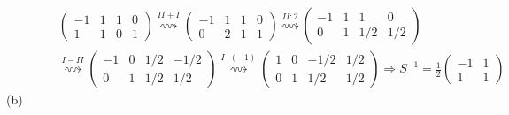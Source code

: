 \documentclass[titlepage]{article}
\newcommand{\1}{\mathbb{1}}
\newcommand{\0}{\mathbb{0}}
\newcommand{\matrixZ}[4]{\begin{pmatrix}#1&#2\\#3&#4\end{pmatrix}}
\begin{document}
\begin{align*}
				&\quad\quad\quad
				\left(\begin{array}{cc|cc}
					-1&1&1&0\\1&1&0&1
				\end{array}\right)
				\overset{II+I}{\rightsquigarrow}
				\left(\begin{array}{cc|cc}
					-1&1&1&0\\0&2&1&1
				\end{array}\right)
				\overset{II:2}{\rightsquigarrow}
				\left(\begin{array}{cc|cc}
					-1&1&1&0\\0&1&1/2&1/2
				\end{array}\right)\\
				&\quad\quad\quad
				\overset{I-II}{\rightsquigarrow}
				\left(\begin{array}{cc|cc}
					-1&0&1/2&-1/2\\0&1&1/2&1/2
				\end{array}\right)
				\overset{I\cdot(-1)}{\rightsquigarrow}
				\left(\begin{array}{cc|cc}
					1&0&-1/2&1/2\\0&1&1/2&1/2
				\end{array}\right)\Rightarrow S^{-1}=\frac{1}{2}\matrixZ{-1}{1}{1}{1}
			\end{align*}
		(b)
\end{document}
